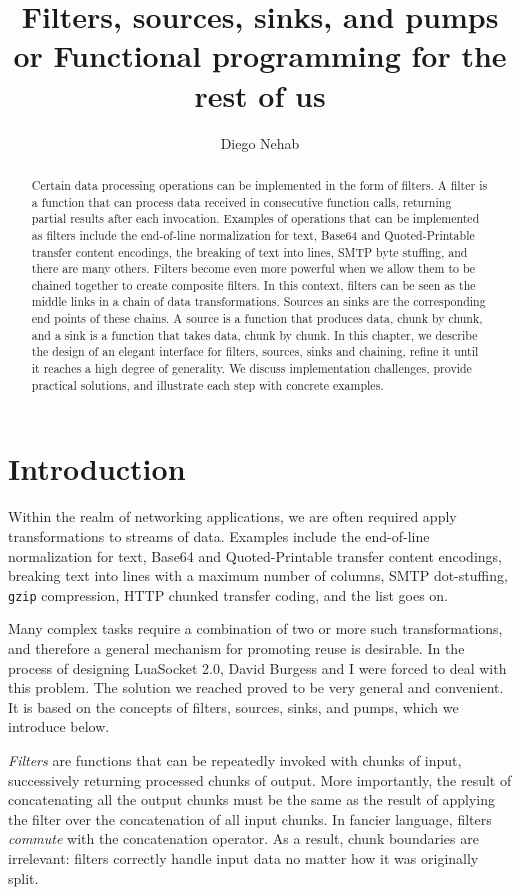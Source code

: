 \documentclass[10pt]{article}
\title{Filters, sources, sinks, and pumps\\
      {\large or Functional programming for the rest of us}}
\author{Diego Nehab}
\begin{document}
\maketitle

\begin{abstract}
Certain data processing operations can be implemented in the 
form of filters. A filter is a function that can process data 
received in consecutive function calls, returning partial
results after each invocation.  Examples of operations that can be
implemented as filters include the end-of-line normalization
for text, Base64 and Quoted-Printable transfer content
encodings, the breaking of text into lines, SMTP byte
stuffing, and there are many others.  Filters become even
more powerful when we allow them to be chained together to
create composite filters. In this context, filters can be seen 
as the middle links in a chain of data transformations. Sources an sinks
are the corresponding end points of these chains. A source
is a function that produces data, chunk by chunk, and a sink
is a function that takes data, chunk by chunk. In this
chapter, we describe the design of an elegant interface for filters,
sources, sinks and chaining, refine it 
until it reaches a high degree of generality. We discuss
implementation challenges, provide practical solutions,
and illustrate each step with concrete examples. 
\end{abstract}


\section{Introduction}

Within the realm of networking applications, we are often
required apply transformations to streams of data. Examples
include the end-of-line normalization for text, Base64 and
Quoted-Printable transfer content encodings, breaking text
into lines with a maximum number of columns, SMTP
dot-stuffing, \texttt{gzip} compression, HTTP chunked
transfer coding, and the list goes on.

Many complex tasks require a combination of two or more such
transformations, and therefore a general mechanism for
promoting reuse is desirable. In the process of designing
LuaSocket 2.0, David Burgess and I were forced to deal with
this problem. The solution we reached proved to be very
general and convenient. It is based on the concepts of
filters, sources, sinks, and pumps, which we introduce
below. 

\emph{Filters} are functions that can be repeatedly invoked
with chunks of input, successively returning processed
chunks of output. More importantly, the result of
concatenating all the output chunks must be the same as the
result of applying the filter over the concatenation of all
input chunks. In fancier language, filters \emph{commute}
with the concatenation operator. As a result, chunk
boundaries are irrelevant: filters correctly handle input
data no matter how it was originally split. 
\end{document}
